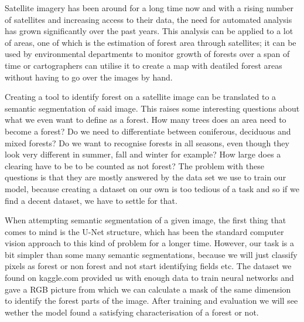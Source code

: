 Satellite imagery has been around for a long time now and with a rising number of satellites and increasing access to their data, the need for automated analysis has grown significantly over the past years. This analysis can be applied to a lot of areas, one of which is the estimation of forest area through satellites; it can be used by environmental departments to monitor growth of forests over a span of time or cartographers can utilise it to create a map with deatiled forest areas without having to go over the images by hand.

Creating a tool to identify forest on a satellite image can be translated to a semantic segmentation of said image. This raises some interesting questions about what we even want to define as a forest. How many trees does an area need to become a forest? Do we need to differentiate between coniferous, deciduous and mixed forests? Do we want to recognise forests in all seasons, even though they look very different in summer, fall and winter for example? How large does a clearing have to be to be counted as not forest? The problem with these questions is that they are mostly answered by the data set we use to train our model, because creating a dataset on our own is too tedious of a task and so if we find a decent dataset, we have to settle for that.

When attempting semantic segmentation of a given image, the first thing that comes to mind is the U-Net structure, which has been the standard computer vision approach to this kind of problem for a longer time. However, our task is a bit simpler than some many semantic segmentations, because we will just classify pixels as forest or non forest and not start identifying fields etc. The dataset we found on kaggle.com provided us with enough data to train neural networks and gave a RGB picture from which we can calculate a mask of the same dimension to identify the forest parts of the image. After training and evaluation we will see wether the model found a satisfying characterisation of a forest or not.
